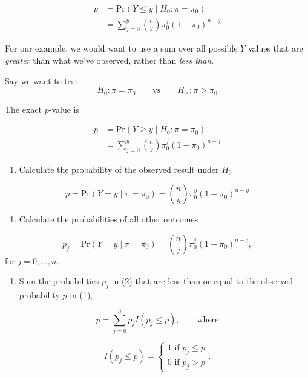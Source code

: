 \documentclass[
  letterpaper,
  DIV=11,
  numbers=noendperiod]{scrreport}
\providecommand{\tightlist}{%
  \setlength{\itemsep}{0pt}\setlength{\parskip}{0pt}}\usepackage{longtable,booktabs,array}
\begin{document}
\[
\begin{aligned}
p & = \mathrm{Pr}(Y \le y \mid H_0 \colon \pi = \pi_0) \\ 
& = \sum_{j = 0}^y {n \choose y} \pi_0^j (1-\pi_0)^{n-j}
\end{aligned}
\]

For our example, we would want to use a sum over all possible \(Y\)
values that are \emph{greater} than what we've observed, rather than
\emph{less than}.

Say we want to test
\[H_0 \colon \pi = \pi_0 \quad \quad \text{vs} \quad \quad H_A \colon \pi > \pi_0
\]

The exact \(p\)-value is

\[
\begin{aligned}
p & = \mathrm{Pr}(Y \ge y \mid H_0 \colon \pi = \pi_0) \\ 
& = \sum_{j=0}^y {n \choose y} \pi_0^j (1-\pi_0)^{n-j}
\end{aligned}
\]

\begin{enumerate}
\def\labelenumi{\arabic{enumi}.}
\tightlist
\item
  Calculate the probability of the observed result under \(H_0\)
\end{enumerate}

\[
p = \mathrm{Pr}(Y = y \mid \pi = \pi_0) = {n \choose y} \pi_0^y (1-\pi_0)^{n-y}
\]

\begin{enumerate}
\def\labelenumi{\arabic{enumi}.}
\setcounter{enumi}{1}
\tightlist
\item
  Calculate the probabilities of all other outcomes
\end{enumerate}

\[p_j = \mathrm{Pr}(Y=y \mid \pi=\pi_0) = {n \choose j} \pi_0^j (1-\pi_0)^{n-j},
\] for \(j = 0,...,n.\)

\begin{enumerate}
\def\labelenumi{\arabic{enumi}.}
\setcounter{enumi}{2}
\tightlist
\item
  Sum the probabilities \(p_j\) in (2) that are less than or equal to
  the observed probability \(p\) in (1),
\end{enumerate}

\[
p = \sum_{j=0}^n p_j I(p_j \leq p), \quad \quad \text{where}
\]

\[I(p_j \leq p) = \left\{ \begin{array}{l} 1 \text{ if } p_j \leq p \\ 0 \text{ if } p_j > p \end{array}\right. .
\]
\end{document}
